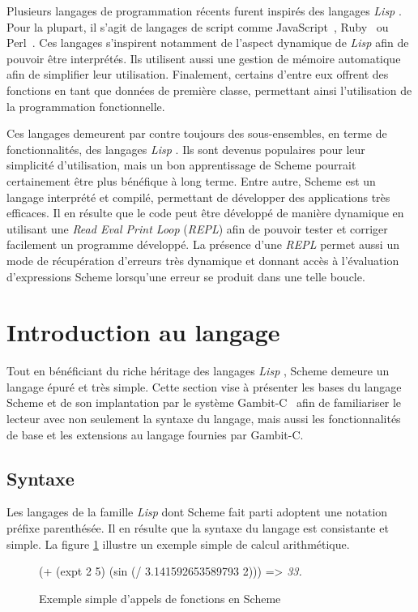 \documentclass[12pt,oneside,letterpaper,francais]{book}
\newcommand{\lisp}{{\textit{Lisp }}}
\newcommand{\schemeresult}[1]{{\it #1}}
\begin{document}
Plusieurs langages de programmation récents furent inspirés des
langages \lisp. Pour la plupart, il s'agit de langages de script comme
JavaScript~\cite{ECMA-262}, Ruby~\cite{RUBY} ou Perl~\cite{PERL}. Ces
langages s'inspirent notamment de l'aspect dynamique de \lisp afin de
pouvoir être interprétés. Ils utilisent aussi une gestion de mémoire
automatique afin de simplifier leur utilisation. Finalement, certains
d'entre eux offrent des fonctions en tant que données de première
classe, permettant ainsi l'utilisation de la programmation
fonctionnelle.

Ces langages demeurent par contre toujours des sous-ensembles, en
terme de fonctionnalités, des langages \lisp. Ils sont devenus
populaires pour leur simplicité d'utilisation, mais un bon
apprentissage de Scheme pourrait certainement être plus bénéfique à
long terme. Entre autre, Scheme est un langage interprété et compilé,
permettant de développer des applications très efficaces. Il en
résulte que le code peut être développé de manière dynamique en
utilisant une \textit{Read Eval Print Loop} (\textit{REPL}) afin de
pouvoir tester et corriger facilement un programme développé. La
présence d'une \textit{REPL} permet aussi un mode de récupération
d'erreurs très dynamique et donnant accès à l'évaluation d'expressions
Scheme lorsqu'une erreur se produit dans une telle boucle.


\section{Introduction au langage}
Tout en bénéficiant du riche héritage des langages \lisp, Scheme
demeure un langage épuré et très simple. Cette section vise à
présenter les bases du langage Scheme et de son implantation par le
système Gambit-C~\cite{Gambit4} afin de familiariser le lecteur avec
non seulement la syntaxe du langage, mais aussi les fonctionnalités de
base et les extensions au langage fournies par Gambit-C.

\subsection{Syntaxe}
Les langages de la famille \lisp dont Scheme fait parti adoptent une
notation préfixe parenthésée. Il en résulte que la syntaxe du langage
est consistante et simple. La figure \ref{Scheme:simple-ex} illustre
un exemple simple de calcul arithmétique.

\begin{figure}[htb]
  \begin{schemecode}
(+ (expt 2 5) (sin (/ 3.141592653589793 2))) => \schemeresult{33.}
  \end{schemecode}
  \caption{Exemple simple d'appels de fonctions en Scheme}
  \label{Scheme:simple-ex}
\end{figure}
\end{document}

